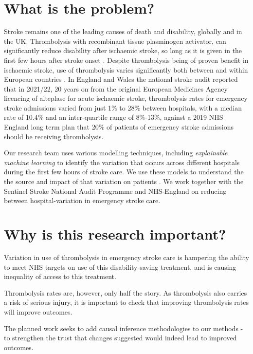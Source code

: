 \section{What is the problem?}

Stroke remains one of the leading causes of death and disability, globally and in the UK. Thrombolysis with recombinant tissue plasminogen activator, can significantly reduce disability after ischaemic stroke, so long as it is given in the first few hours after stroke onset \cite{emberson_effect_2014}. Despite thrombolysis being of proven benefit in ischaemic stroke, use of thrombolysis varies significantly both between and within European countries \cite{aguiar_de_sousa_access_2019}. In England and Wales the national stroke audit reported that in 2021/22, 20 years on from the original European Medicines Agency licencing of alteplase for acute ischaemic stroke, thrombolysis rates for emergency stroke admissions varied from just 1\% to 28\% between hospitals, with a median rate of 10.4\% and an inter-quartile range of 8\%-13\%, against a 2019 NHS England long term plan that 20\% of patients of emergency stroke admissions should be receiving thrombolysis.

Our research team uses various modelling techniques, including \textit{explainable machine learning} to identify the variation that occurs across different hospitals during the first few hours of stroke care. We use these models to understand the the source and impact of that variation on patients \cite{allen_using_2022, allen_use_2022}. We work together with the Sentinel Stroke National Audit Programme and NHS-England on reducing between hospital-variation in emergency stroke care. 

\section{Why is this research important?}

Variation in use of thrombolysis in emergency stroke care is hampering the ability to meet NHS targets on use of this disability-saving treatment, and is causing inequality of access to this treatment. 

Thrombolysis rates are, however, only half the story. As thrombolysis also carries a risk of serious injury, it is important to check that improving thrombolysis rates will improve outcomes.

The planned work seeks to add causal inference methodologies to our methods - to strengthen the trust that changes suggested would indeed lead to improved outcomes.

